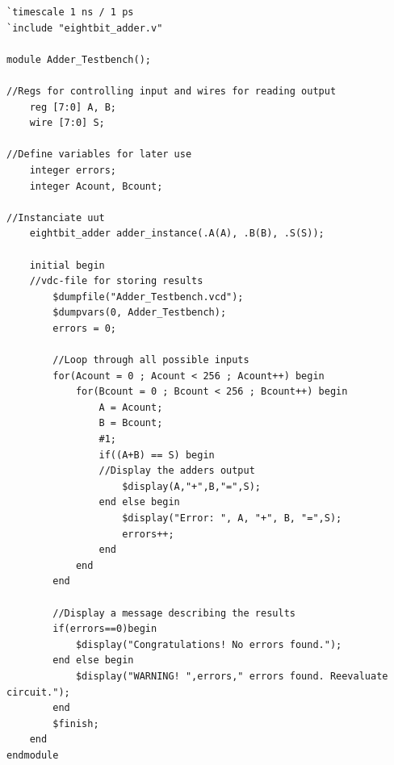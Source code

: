 \begin{lstlisting}[style=verilogStyle, caption=Adder Testbench in Verilog, label=verilog_adderTB]
`timescale 1 ns / 1 ps
`include "eightbit_adder.v"

module Adder_Testbench();

//Regs for controlling input and wires for reading output
    reg [7:0] A, B;
    wire [7:0] S;

//Define variables for later use
    integer errors;
    integer Acount, Bcount;

//Instanciate uut
    eightbit_adder adder_instance(.A(A), .B(B), .S(S));

    initial begin
    //vdc-file for storing results
        $dumpfile("Adder_Testbench.vcd");
        $dumpvars(0, Adder_Testbench);
        errors = 0;

        //Loop through all possible inputs
        for(Acount = 0 ; Acount < 256 ; Acount++) begin
            for(Bcount = 0 ; Bcount < 256 ; Bcount++) begin
                A = Acount;
                B = Bcount;
                #1;
                if((A+B) == S) begin
                //Display the adders output
                    $display(A,"+",B,"=",S);
                end else begin
                    $display("Error: ", A, "+", B, "=",S);
                    errors++;
                end
            end
        end

        //Display a message describing the results
        if(errors==0)begin
            $display("Congratulations! No errors found.");
        end else begin
            $display("WARNING! ",errors," errors found. Reevaluate circuit.");
        end
        $finish;
    end
endmodule
\end{lstlisting}


